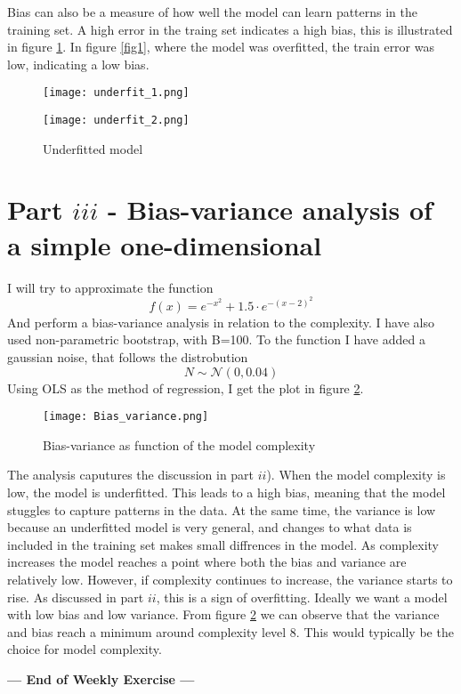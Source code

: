 \documentclass{article}
\begin{document}
Bias can also be a measure of how well the model can learn patterns in the training set. A high error in the traing set
indicates a high bias, this is illustrated in figure \ref{fig2}. In figure \ref{fig1}, where the model was overfitted,
the train error was low, indicating a low bias.  


\begin{figure}[ht]
    \centering
    \begin{minipage}{0.5\textwidth}
        \centering
        \texttt{[image: underfit\_1.png]}
    \end{minipage}\hfill
    \begin{minipage}{0.5\textwidth}
        \centering
        \texttt{[image: underfit\_2.png]}
    \end{minipage}\hfill
    \caption{Underfitted model}
    \label{fig2}
\end{figure}

\section*{Part \(iii\) - Bias-variance analysis of a simple one-dimensional}
I will try to approximate the function
$$f(x) = e^{-x^2} + 1.5 \cdot e^{-(x-2)^2}$$
And perform a bias-variance analysis in relation to the complexity. I have also used non-parametric bootstrap, with B=100.
To the function I have added a gaussian noise, that follows the distrobution
$$N \sim \mathcal{N}(0, 0.04)$$
Using OLS as the method of regression, I get the plot in figure \ref{fig3}.

\begin{figure}[h!]
    \centering
    \texttt{[image: Bias\_variance.png]} %
    \caption{Bias-variance as function of the model complexity} %
    \label{fig3} 
\end{figure}

The analysis caputures the discussion in part \(ii\)). When the model complexity is low, the model is underfitted.
This leads to a high bias, meaning that the model stuggles to capture patterns in the data. At the same time, the variance is low
because an underfitted model is very general, and changes to what data is included in the training set
makes small diffrences in the model. As complexity increases the model reaches a point where both
the bias and variance are relatively low. However, if complexity continues to increase, the variance
starts to rise. As discussed in part \(ii\), this is a sign of overfitting. Ideally we want a model with 
low bias and low variance. From figure \ref{fig3} we can observe that the variance and bias reach a minimum around 
complexity level 8. This would typically be the choice for model complexity.  

\hfill
\begin{center}
\textbf{--- End of Weekly Exercise ---}
\end{center}
\end{document}
